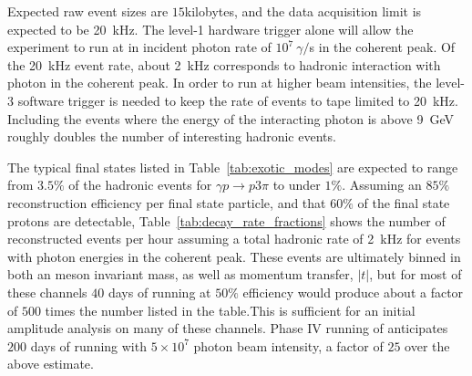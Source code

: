 Expected raw event sizes are $15$kilobytes, and the data acquisition limit is expected to 
be 20~kHz. The level-1 hardware trigger alone will allow the experiment to run 
at in incident photon rate of $10^{7}~\gamma/$s in the coherent peak. Of the 20~kHz
event rate, about 2~kHz corresponds to hadronic interaction with photon in the coherent
peak. In order to run at higher beam intensities, the level-3 software trigger is needed to 
keep the rate of events to tape limited to 20~kHz. Including the events where the energy
of the interacting photon is above 9~GeV roughly doubles the number of interesting hadronic
events. 

The typical final states listed in Table~\ref{tab:exotic_modes} are expected to range from $3.5\%$ 
of the hadronic events for $\gamma p \rightarrow p 3\pi$ to under $1\%$. Assuming an $85\%$
reconstruction efficiency per final state particle, and that $60\%$ of the final state protons
are detectable, Table~\ref{tab:decay_rate_fractions} shows the number of reconstructed events per
hour assuming a total hadronic rate of 2~kHz for events with photon energies in the coherent
peak. These events are ultimately binned in both an meson invariant mass, as well as momentum
transfer, $|t|$, but for most of these channels $40$ days of running at $50\%$ efficiency would 
produce about a factor of $500$ times the number listed in the table.This is sufficient for
an initial amplitude analysis on many of these channels. Phase IV running of \GX{} anticipates 
$200$ days of running with $5\times  10^{7}$ photon beam intensity, a factor of $25$ over the
above estimate.

